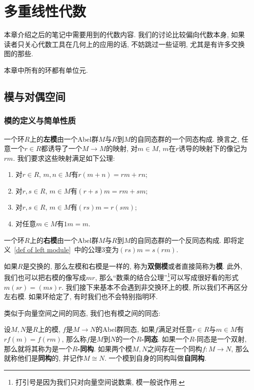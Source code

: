 \chapter{多重线性代数}\label{chapter_tensor}
本章介绍之后的笔记中需要用到的代数内容.
我们的讨论比较偏向代数本身, 如果读者只关心代数工具在几何上的应用的话, 不妨跳过一些证明, 尤其是有许多交换图的那些.

本章中所有的环都有单位元.

\section{模与对偶空间}

\subsection*{模的定义与简单性质}

\begin{defn}\label{def of left module}
    一个环$R$上的\textbf{左模}由一个Abel群$M$与$R$到$M$的自同态群的一个同态构成.
    换言之, 任意一个$r\in R$都诱导了一个$M\to M$的映射, 对$m\in M$, $m$在$r$诱导的映射下的像记为$rm$.
    我们要求这些映射满足如下公理:
    \begin{enumerate}
        \item 对$r\in R$, $m,n\in M$有$r(m+n)=rm+rn$;
        \item 对$r,s\in R$, $m\in M$有$(r+s)m=rm+sm$;
        \item 对$r,s\in R$, $m\in M$有$(rs)m=r(sm)$;
        \item 对任意$m\in M$有$1m=m$.
    \end{enumerate}
\end{defn}

\begin{defn}
    一个环$R$上的\textbf{右模}由一个Abel群$M$与$R$到$M$的自同态群的一个反同态构成.
    即将定义~\ref{def of left module}~中的公理3变为$(rs)m=s(rm)$.
\end{defn}

\begin{rem}
    如果$R$是交换的, 那么左模和右模是一样的, 称为\textbf{双侧模}或者直接简称为\textbf{模}.
    此外, 我们也可以把右模的像写成$mr$, 那么``数乘的结合公理''\footnote{打引号是因为我们只对向量空间说数乘, 模一般说作用.}可以写成很好看的形式$m(sr)=(ms)r$.
    我们接下来基本不会遇到非交换环上的模, 所以我们不再区分左右模.
    如果环给定了, 有时我们也不会特别指明环.
\end{rem}

类似于向量空间之间的同态, 我们也有模之间的同态:
\begin{defn}
    设$M,N$是$R$上的模, $f$是$M\to N$的Abel群同态, 如果$f$满足对任意$r\in R$与$m\in M$有$rf(m)=f(rm)$, 那么称$f$是$M$到$N$的一个\textbf{$R$-同态}.
    如果一个$R$-同态是一个双射, 那么就将其称为是一个\textbf{$R$-同构}.
    如果两个模$M,N$之间存在一个同构$f:M\to N$, 那么就称他们是\textbf{同构}的, 并记作$M\cong N$.
    一个模到自身的同构叫做\textbf{自同构}.
\end{defn}


